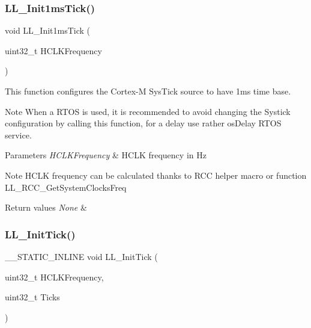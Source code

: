 \subsubsection{\texorpdfstring{L\+L\+\_\+\+Init1ms\+Tick()}{LL\_Init1msTick()}}
{\footnotesize\ttfamily void L\+L\+\_\+\+Init1ms\+Tick (\begin{DoxyParamCaption}\item[{uint32\+\_\+t}]{H\+C\+L\+K\+Frequency }\end{DoxyParamCaption})}



This function configures the Cortex-\/M Sys\+Tick source to have 1ms time base. 

\begin{DoxyNote}{Note}
When a R\+T\+OS is used, it is recommended to avoid changing the Systick configuration by calling this function, for a delay use rather os\+Delay R\+T\+OS service. 
\end{DoxyNote}

\begin{DoxyParams}{Parameters}
{\em H\+C\+L\+K\+Frequency} & H\+C\+LK frequency in Hz \\
\hline
\end{DoxyParams}
\begin{DoxyNote}{Note}
H\+C\+LK frequency can be calculated thanks to R\+CC helper macro or function L\+L\+\_\+\+R\+C\+C\+\_\+\+Get\+System\+Clocks\+Freq 
\end{DoxyNote}

\begin{DoxyRetVals}{Return values}
{\em None} & \\
\hline
\end{DoxyRetVals}
\mbox{\label{group___u_t_i_l_s___l_l___e_f___d_e_l_a_y_ga170d1d651b46544daf571fb6b4e3b850}} 
\subsubsection{\texorpdfstring{L\+L\+\_\+\+Init\+Tick()}{LL\_InitTick()}}
{\footnotesize\ttfamily \+\_\+\+\_\+\+S\+T\+A\+T\+I\+C\+\_\+\+I\+N\+L\+I\+NE void L\+L\+\_\+\+Init\+Tick (\begin{DoxyParamCaption}\item[{uint32\+\_\+t}]{H\+C\+L\+K\+Frequency,  }\item[{uint32\+\_\+t}]{Ticks }\end{DoxyParamCaption})}



